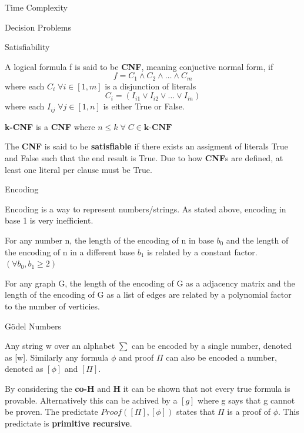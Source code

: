 \documentclass[12pt, letterpaper]{article}
\begin{document}
\begin{section}{Time Complexity}
\begin{subsection}{Decision Problems}
    \begin{subsubsection}{Satisfiability}

      A logical formula f is said to be \textbf{CNF}, meaning conjuctive normal form, if
      \[f = C_{1} \land C_{2} \land \dots \land C_{m}\]
      where each \(C_{i} \; \forall i \in [1, m]\) is a disjunction of literals
      \[C_{i} = (I_{i1} \lor I_{i2} \lor \dots \lor I_{in})\]
      where each \(I_{ij} \; \forall j \in [1, n]\) is either True or False.

      \textbf{k-CNF} is a \textbf{CNF} where \(n \leq k \; \forall \; C \in \textbf{k-CNF}\)

      The \textbf{CNF} is said to be \textbf{satisfiable} if there exists an
      assigment of literals True and False such that the end result is True.
      Due to how \textbf{CNF}s are defined, at least one literal per clause must be True.

    \end{subsubsection}

  \end{subsection}

  \begin{subsection}{Encoding}

    Encoding is a way to represent numbers/strings. As stated above, encoding
    in base 1 is very inefficient.

    For any number n, the length of the encoding of n in base \(b_{0}\) and the
    length of the encoding of n in a different base \(b_{1}\) is related by
    a constant factor.\ \((\forall b_{0}, b_{1} \geq 2)\)

    For any graph G, the length of the encoding of G as a adjacency matrix and
    the length of the encoding of G as a list of edges are related by
    a polynomial factor to the number of verticies.

    \begin{subsubsection}{Gödel Numbers}

      Any string w over an alphabet \(\sum\) can be encoded by a single number,
      denoted as [w]. Similarly any formula \(\phi\) and proof \(\Pi\)
      can also be encoded a number, denoted as \([\phi]\) and \([\Pi]\).

      By considering the \textbf{co-H} and \textbf{H} it can be shown that not
      every true formula is provable. Alternatively this can be achived by a
      \([g]\) where g says that g cannot be proven. The predictate %
      \textit{\(Proof([\Pi], [\phi])\)} states that \(\Pi\) is a proof of \(\phi\).
      This predictate is \textbf{primitive recursive}.


\end{subsubsection}
\end{subsection}
\end{section}
\end{document}
